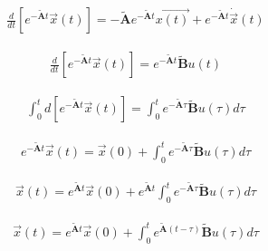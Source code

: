 \documentclass[11pt,a4paper,oneside]{book}
\numberwithin{equation}{section}
\theoremstyle{it}
\theoremstyle{definition}
\begin{document}
\begin{equation}\label{discretization_css_3}
	\begin{aligned}
		\frac{d}{dt}\left[ e^{-\tilde{\mathbf{A}}t} \vec{x}(t) \right] =  -\tilde{\mathbf{A}}e^{-\tilde{\mathbf{A}}t}\vec{x(t)} + e^{-\tilde{\mathbf{A}}t} \dot{\vec{x}}(t)
	\end{aligned}
\end{equation}

\begin{equation}\label{discretization_css_4}
	\begin{aligned}
		\frac{d}{dt}\left[ e^{-\tilde{\mathbf{A}}t} \vec{x}(t) \right] =  e^{-\tilde{\mathbf{A}}t} \tilde{\mathbf{B}}u(t)
	\end{aligned}
\end{equation}

\begin{equation}\label{discretization_css_5}
	\begin{aligned}
		\int_{0}^{t}d\left[ e^{-\tilde{\mathbf{A}}t} \vec{x}(t) \right] = \int_{0}^{t}e^{-\tilde{\mathbf{A}}\tau} \tilde{\mathbf{B}}u(\tau)d\tau
	\end{aligned}
\end{equation}

\begin{equation}\label{discretization_css_6}
	\begin{aligned}
		e^{-\tilde{\mathbf{A}}t} \vec{x}(t) = \vec{x}(0) + \int_{0}^{t}e^{-\tilde{\mathbf{A}}\tau} \tilde{\mathbf{B}}u(\tau)d\tau
	\end{aligned}
\end{equation}

\begin{equation}\label{discretization_css_7}
	\begin{aligned}
		\vec{x}(t) = e^{\tilde{\mathbf{A}}t} \vec{x}(0) + e^{\tilde{\mathbf{A}}t}  \int_{0}^{t}e^{-\tilde{\mathbf{A}}\tau} \tilde{\mathbf{B}}u(\tau)d\tau
	\end{aligned}
\end{equation}
\begin{mybox}
	\begin{equation}\label{discretization_css_8}
		\begin{aligned}
			\vec{x}(t) = e^{\tilde{\mathbf{A}}t} \vec{x}(0) + 
			\int_{0}^{t}e^{\tilde{\mathbf{A}}\left(t-\tau\right)} 
			\tilde{\mathbf{B}}u(\tau)d\tau
		\end{aligned}
	\end{equation}
\end{mybox}
\end{document}
